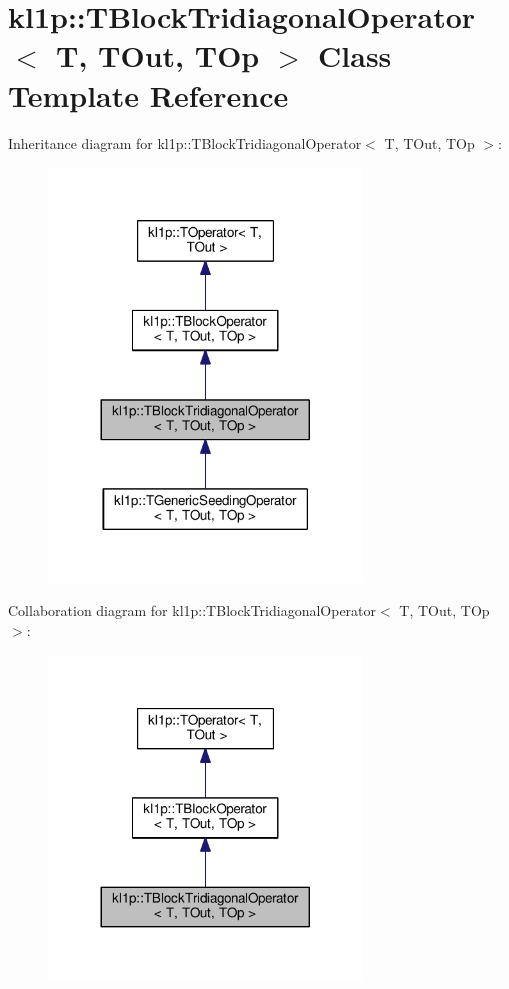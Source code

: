 \hypertarget{classkl1p_1_1TBlockTridiagonalOperator}{}\section{kl1p\+:\+:T\+Block\+Tridiagonal\+Operator$<$ T, T\+Out, T\+Op $>$ Class Template Reference}
\label{classkl1p_1_1TBlockTridiagonalOperator}


Inheritance diagram for kl1p\+:\+:T\+Block\+Tridiagonal\+Operator$<$ T, T\+Out, T\+Op $>$\+:
\nopagebreak
\begin{figure}[H]
\begin{center}
\leavevmode
\includegraphics[width=236pt]{classkl1p_1_1TBlockTridiagonalOperator__inherit__graph}
\end{center}
\end{figure}


Collaboration diagram for kl1p\+:\+:T\+Block\+Tridiagonal\+Operator$<$ T, T\+Out, T\+Op $>$\+:
\nopagebreak
\begin{figure}[H]
\begin{center}
\leavevmode
\includegraphics[width=236pt]{classkl1p_1_1TBlockTridiagonalOperator__coll__graph}
\end{center}
\end{figure}
